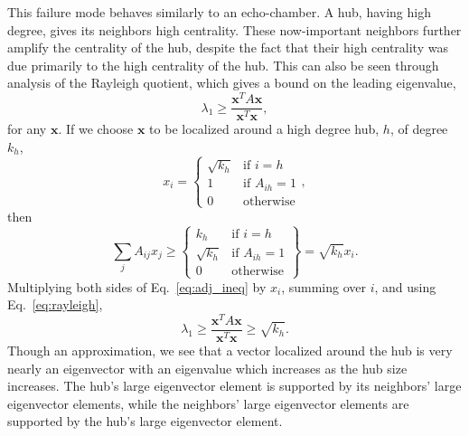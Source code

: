\documentclass[twocolumn,prl,superscriptaddress]{revtex4}
\renewcommand{\vec}{\mathbf}
\begin{document}
This failure mode behaves similarly to an echo-chamber.
A hub, having high degree, gives its neighbors high centrality. These now-important neighbors further amplify the centrality of the hub, despite the fact that their high centrality was due primarily to the high centrality of the hub.
This can also be seen through analysis of the Rayleigh quotient, which gives a bound on the leading eigenvalue,
\begin{equation}
\lambda_1 \geq \frac{\vec{x}^{T} A \vec{x}}{\vec{x}^T\vec{x}}, \label{eq:rayleigh}
\end{equation}
for any $\vec{x}$. If we choose $\vec{x}$ to be localized around a high degree hub, $h$, of degree $k_h$,
\begin{equation*}
x_i = 
\begin{cases}
  \sqrt{k_h} & \text{if } i=h\\
  1          & \text{if } A_{ih} = 1\\
  0          & \text{otherwise}
\end{cases},
\end{equation*}
then
\begin{equation}
\sum_j A_{ij} x_j \geq
  \left.\begin{cases}
  k_h & \text{if } i=h\\
  \sqrt{k_h} & \text{if } A_{ih} = 1\\
  0          & \text{otherwise}
  \end{cases} \right\} = \sqrt{k_h} x_i.
  \label{eq:adj_ineq}
\end{equation}
Multiplying both sides of Eq.~\eqref{eq:adj_ineq} by $x_i$, summing over $i$, and using Eq.~\eqref{eq:rayleigh},
\begin{equation*}
\lambda_1 \geq \frac{\vec{x}^{T} A \vec{x}}{\vec{x}^T\vec{x}} \geq \sqrt{k_h}.
\end{equation*}
Though an approximation, we see that a vector localized around the hub is very nearly an eigenvector with an eigenvalue which increases as the hub size increases. The hub's large eigenvector element is supported by its neighbors' large eigenvector elements, while the neighbors' large eigenvector elements are supported by the hub's large eigenvector element.
\end{document}
